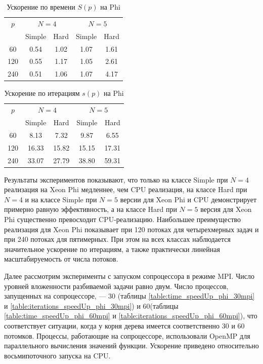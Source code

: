 \begin{table}
    \centering
    \begin{tabular}{|c|c|c|c|c|}
    \hline
    \(p\) & \multicolumn{2}{|c|}{\(N=4\)} & \multicolumn{2}{|c|}{\(N=5\)}\\ \cline{2-5}
    & Simple & Hard & Simple & Hard \\ \hline
	60 & 0.54 & 1.02 & 1.07 & 1.61\\ \hline
	120 & 0.55 & 1.17 & 1.05 & 2.61\\ \hline
	240 & 0.51 & 1.06 & 1.07 & 4.17\\ \hline
    \end{tabular}
    \caption{Ускорение по времени \(S(p)\) на Phi}
    \label{table:time_speedUp_phi}
\end{table}
\begin{table}
    \centering
    \begin{tabular}{|c|c|c|c|c|}
    \hline
    \(p\) & \multicolumn{2}{|c|}{\(N=4\)} & \multicolumn{2}{|c|}{\(N=5\)}\\ \cline{2-5}
    & Simple & Hard & Simple & Hard \\ \hline
	60 & 8.13 & 7.32 & 9.87 & 6.55 \\ \hline
	120 & 16.33 & 15.82 & 15.15 & 17.31 \\ \hline
	240 & 33.07 & 27.79 & 38.80 & 59.31 \\ \hline
    \end{tabular}
    \caption{Ускорение по итерациям \(s(p)\) на Phi}
    \label{table:iterations_speedUp_phi}
\end{table}
\par
Результаты экспериментов показывают, что только на классе Simple при \(N=4\) реализация на Xeon Phi медленнее, чем CPU реализация, на классе Hard при \(N=4\) и на классе Simple при \(N=5\) версии для Xeon Phi и CPU демонстрирует примерно равную эффективность, а на классе Hard при \(N=5\) версия для Xeon Phi существенно превосходит CPU-реализацию. Наибольшее преимущество реализация для Xeon Phi показывает при 120 потоках для четырехмерных задач и при 240 потоках для пятимерных. При этом на всех классах наблюдается значительное ускорение по итерациям, а также практически линейная масштабируемость от числа потоков.
\par
Далее рассмотрим эксперименты с запуском сопроцессора в режиме MPI. Число уровней вложенности разбиваемой задачи равно двум. Число процессов, запущенных на сопроцессоре, –-- 30 (таблицы \ref{table:time_speedUp_phi_30mpi} и \ref{table:iterations_speedUp_phi_30mpi}) и 60(таблицы \ref{table:time_speedUp_phi_60mpi} и \ref{table:iterations_speedUp_phi_60mpi}), что соответствует ситуации, когда у корня дерева имеется соответственно 30 и 60 потомков. Процессы, работающие на сопроцессоре, использовали OpenMP для параллельного вычисления значений функции. Ускорение приведено относительно восьмипоточного запуска на CPU.

